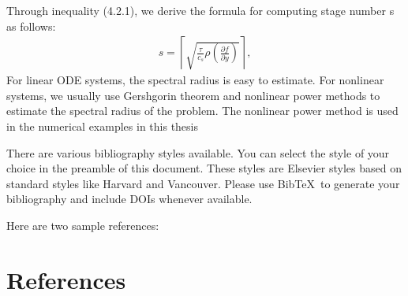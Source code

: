\documentclass[review]{elsarticle}
\begin{document}
Through inequality (4.2.1), we derive the formula for computing stage number s as follows:
\begin{align}
    s=\left\lceil\sqrt{\frac{\tau}{c_s}\rho(\frac{\partial f}{\partial y})}\right\rceil ,\nonumber
\end{align}
For linear ODE systems, the spectral radius is easy to estimate.
For nonlinear systems, we usually use Gershgorin theorem and nonlinear power methods to estimate the spectral radius of the problem.
The nonlinear power method is used in the numerical examples in this thesis

















There are various bibliography styles available. You can select the style of your choice in the preamble of this document. These styles are Elsevier styles based on standard styles like Harvard and Vancouver. Please use Bib\TeX\ to generate your bibliography and include DOIs whenever available.

Here are two sample references: \cite{Feynman1963118,Dirac1953888}

\section*{References}


\end{document}

